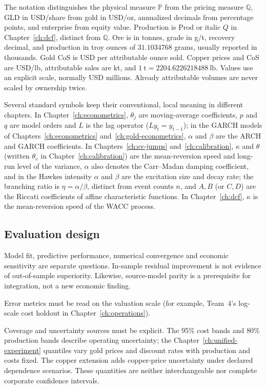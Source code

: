 The notation distinguishes the physical measure $\mathbb P$ from the pricing
measure $\mathbb Q$, GLD in USD/share from gold in USD/oz, annualized decimals
from percentage points, and enterprise from equity value. Production is
$\mathrm{Prod}$ or italic $Q$ in Chapter~\ref{ch:dcf}, distinct from $\mathbb Q$.
Ore is in tonnes, grade in g/t, recovery decimal, and production in troy
ounces of $31.1034768$ grams, usually reported in thousands. Gold CoS is USD
per attributable ounce sold. Copper prices and CoS are USD/lb, attributable
sales are kt, and $1~\mathrm{t}=2204.6226218488~\mathrm{lb}$. Values use an
explicit scale, normally USD millions. Already attributable volumes are never scaled by
ownership twice.

Several standard symbols keep their conventional, local meaning in different
chapters. In Chapter~\ref{ch:econometrics}, $\theta_j$ are moving-average
coefficients, $p$ and $q$ are model orders and $L$ is the lag operator
($Ly_t=y_{t-1}$); in the GARCH models of Chapters~\ref{ch:econometrics}
and~\ref{ch:gold-econometrics}, $\alpha$ and $\beta$ are the ARCH and GARCH
coefficients. In Chapters~\ref{ch:sv-jumps} and~\ref{ch:calibration}, $\kappa$
and $\theta$ (written $\theta_v$ in Chapter~\ref{ch:calibration}) are the
mean-reversion speed and long-run level of the variance, $\alpha$ also denotes
the Carr--Madan damping coefficient, and in the Hawkes intensity $\alpha$ and
$\beta$ are the excitation size and decay rate; the branching ratio is
$\eta=\alpha/\beta$, distinct from event counts $n$, and $A,B$ (or $C,D$) are
the Riccati coefficients of affine characteristic functions. In
Chapter~\ref{ch:dcf}, $\kappa$ is the mean-reversion speed of the WACC process.

\subsection{Evaluation design}

Model fit, predictive performance, numerical convergence and economic sensitivity are separate questions. In-sample residual improvement is not evidence of out-of-sample superiority. Likewise, source-model parity is a prerequisite for integration, not a new economic finding.

Error metrics must be read on the valuation scale (for example, Team~4's
log-scale cost holdout in Chapter~\ref{ch:operations}).

Coverage and uncertainty sources must be explicit. The 95\% cost bands and
80\% production bands describe operating uncertainty; the Chapter~\ref{ch:unified-experiment}
quantiles vary gold prices and discount rates with production and costs fixed.
The copper extension adds copper-price uncertainty under declared dependence
scenarios. These quantities are neither interchangeable nor complete
corporate confidence intervals.

